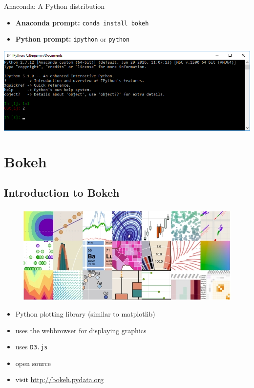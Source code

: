 \documentclass[11pt]{beamer}
\newcommand{\mytexttt}[1]{\colorbox{gray!20}{\texttt{#1}}}
\begin{document}
\begin{frame}
\frametitle{\insertsubsection}
\begin{block}{Anaconda: A Python distribution}
\begin{itemize}
\item \textbf{Anaconda prompt:} \mytexttt{conda install bokeh}
\item \textbf{Python prompt:} \mytexttt{ipython} or \mytexttt{python}
\end{itemize}
\end{block}
\includegraphics[width = \textwidth]{Pictures/PythonShell.png}
\end{frame}

\section{Bokeh}
\subsection{Introduction to Bokeh}
\begin{frame}
\frametitle{\insertsubsection}
\begin{figure}
\includegraphics[width=.8\textwidth]{Pictures/bokehGallery.jpg}
\end{figure}
\begin{itemize}
\item Python plotting library (similar to matplotlib)
\item uses the webbrowser for displaying graphics
\item uses \texttt{D3.js}
\item open source
\item visit \url{http://bokeh.pydata.org}
\end{itemize}
\end{frame}
\end{document}
